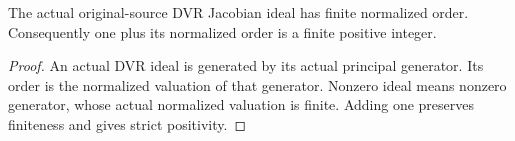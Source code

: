 \begin{corollary}\label{cor:sc0-original-source-dvr-jacobian-finite-order}
\leanok
{}
The actual original-source DVR Jacobian ideal has finite normalized order.
Consequently one plus its normalized order is a finite positive integer.
\end{corollary}
\begin{proof}
An actual DVR ideal is generated by its actual principal generator. Its
order is the normalized valuation of that generator. Nonzero ideal means
nonzero generator, whose actual normalized valuation is finite. Adding one
preserves finiteness and gives strict positivity.
\end{proof}

